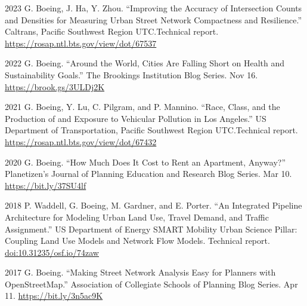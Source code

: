 \documentclass[11pt,letterpaper]{report}
\begin{document}
    \begin{tablist}

        \item[2023] \tab{}G. Boeing, J. Ha, Y. Zhou. \enquote{Improving the Accuracy of Intersection Counts and Densities for Measuring Urban Street Network Compactness and Resilience.} Caltrans, Pacific Southwest Region UTC.\@ Technical report. \href{https://rosap.ntl.bts.gov/view/dot/67537}{https://rosap.ntl.bts.gov/view/dot/67537}


        \item[2022] \tab{}G. Boeing. \enquote{Around the World, Cities Are Falling Short on Health and Sustainability Goals.} The Brookings Institution Blog Series. Nov 16. \href{https://brook.gs/3ULDj2K}{https://brook.gs/3ULDj2K}

        \item[2021] \tab{}G. Boeing, Y. Lu, C. Pilgram, and P. Mannino. \enquote{Race, Class, and the Production of and Exposure to Vehicular Pollution in Los Angeles.} US Department of Transportation, Pacific Southwest Region UTC.\@ Technical report. \href{https://rosap.ntl.bts.gov/view/dot/67432}{https://rosap.ntl.bts.gov/view/dot/67432}

        \item[2020] \tab{}G. Boeing. \enquote{How Much Does It Cost to Rent an Apartment, Anyway?} Planetizen's Journal of Planning Education and Research Blog Series. Mar 10. \href{https://bit.ly/37SU4lf}{https://bit.ly/37SU4lf}

        \item[2018] \tab{}P. Waddell, G. Boeing, M. Gardner, and E. Porter. \enquote{An Integrated Pipeline Architecture for Modeling Urban Land Use, Travel Demand, and Traffic Assignment.} US Department of Energy SMART Mobility Urban Science Pillar: Coupling Land Use Models and Network Flow Models. Technical report. \href{https://doi.org/10.31235/osf.io/74zaw}{doi:10.31235/osf.io/74zaw}

        \item[2017] \tab{}G. Boeing. \enquote{Making Street Network Analysis Easy for Planners with OpenStreetMap.} Association of Collegiate Schools of Planning Blog Series. Apr 11. \href{https://bit.ly/3n5ac9K}{https://bit.ly/3n5ac9K}

    \end{tablist}
\end{document}
